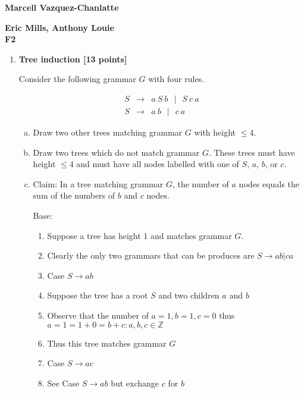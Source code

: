 \documentclass[12pt]{article}
\begin{document}
\begin{center}
{\LARGE
\textbf{Marcell Vazquez-Chanlatte}
\\
[1ex]}
\end{center}
\begin{center}
\textbf{Eric Mills, Anthony Louie}
\\
\textbf{F2}  
\end{center}


\begin{enumerate}

\item
\textbf{Tree induction [13 points]}

Consider the following grammar $G$ with four rules.

\begin{eqnarray*}
S &\rightarrow& a\ S \ b  \ \ \mid \ \ S\ c\ a \\
S &\rightarrow& a\ b \ \ \mid\ \  c\ a
\end{eqnarray*}


\begin{enumerate}[(a)]

\item Draw two other
trees matching grammar $G$ with height  $\le 4$.
\item Draw two trees which do not match grammar $G$.
These trees must have height $\le 4$ and must have all
nodes labelled with one of $S$, $a$, $b$, or $c$.
\newpage
\item Claim: In a tree matching grammar
$G$, the number of $a$ nodes equals the sum of the numbers of $b$ and
$c$ nodes.

Base:
\begin{enumerate}
\item Suppose a tree has height $1$ and matches grammar $G$.
\item Clearly the only two grammars that can be produces are $S
  \rightarrow ab | ca$
\item Case $S \rightarrow ab$
\item Suppose the tree has a root $S$ and two children $a$ and $b$
\item Observe that the number of $a = 1, b = 1,c = 0$ thus $a = 1 = 1 + 0
  =  b + c : a,b,c \in \mathbb{Z}$
\item Thus this tree matches grammar $G$
\item Case $S \rightarrow ac$
\item See Case $S \rightarrow ab$ but exchange $c$ for $b$


\end{enumerate}
\end{enumerate}
\end{enumerate}
\end{document}
